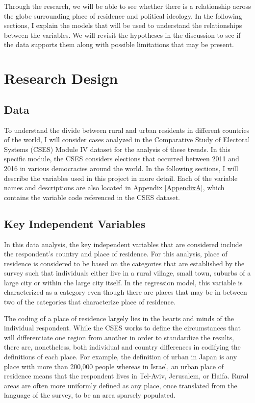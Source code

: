 \documentclass[12pt, titlepage]{article}
\begin{document}
Through the research, we will be able to see whether there is a relationship across the globe surrounding place of residence and political ideology. In the following sections, I explain the models that will be used to understand the relationships between the variables. We will revisit the hypotheses in the discussion to see if the data supports them along with possible limitations that may be present.

\section{Research Design}

\subsection{Data}

To understand the divide between rural and urban residents in different countries of the world, I will consider cases analyzed in the Comparative Study of Electoral Systems (CSES) Module IV dataset for the analysis of these trends. In this specific module, the CSES considers elections that occurred between 2011 and 2016 in various democracies around the world. In the following sections, I will describe the variables used in this project in more detail. Each of the variable names and descriptions are also located in Appendix \ref{AppendixA}, which contains the variable code referenced in the CSES dataset.

\subsection{Key Independent Variables}

In this data analysis, the key independent variables that are considered include the respondent's country and place of residence. For this analysis, place of residence is considered to be based on the categories that are established by the survey such that individuals either live in a rural village, small town, suburbs of a large city or within the large city itself. In the regression model, this variable is characterized as a category even though there are places that may be in between two of the categories that characterize place of residence. 

The coding of a place of residence largely lies in the hearts and minds of the individual respondent. While the CSES works to define the circumstances that will differentiate one region from another in order to standardize the results, there are, nonetheless, both individual and country differences in codifying the definitions of each place. For example, the definition of urban in Japan is any place with more than 200,000 people whereas in Israel, an urban place of residence means that the respondent lives in Tel-Aviv, Jerusalem, or Haifa. Rural areas are often more uniformly defined as any place, once translated from the language of the survey, to be an area sparsely populated. 
\end{document}

